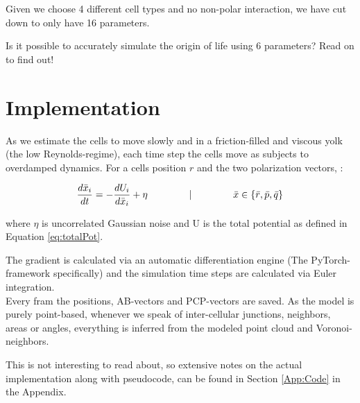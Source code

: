 Given we choose 4 different cell types and no non-polar interaction, we have cut down to only have 16 parameters.

Is it possible to accurately simulate the origin of life using 6 parameters? Read on to find out! 




\section{Implementation}
As we estimate the cells to move slowly and in a friction-filled and viscous yolk (the low Reynolds-regime), each time step the cells move as subjects to overdamped dynamics. For a cells position $r$ and the two polarization vectors, :

\begin{equation}
    \frac{d \bar{x}_i}{d t}=-\frac{d U_i}{d \bar{x}_i}+\eta \hspace{1.5cm}|\hspace{1.5cm}  \bar{x} \in \{\bar{r}, \bar{p}, \bar{q}\}
\end{equation}

where $\eta$ is uncorrelated Gaussian noise and U is the total potential as defined in Equation \ref{eq:totalPot}.

The gradient is calculated via an automatic differentiation engine (The PyTorch-framework specifically) and the simulation time steps are calculated via Euler integration.\\

Every fram the positions, AB-vectors and PCP-vectors are saved. As the model is purely point-based, whenever we speak of inter-cellular junctions, neighbors, areas or angles, everything is inferred from the modeled point cloud and Voronoi-neighbors. 

This is not interesting to read about, so extensive notes on the actual implementation along with pseudocode, can be found in Section \ref{App:Code} in the Appendix.


